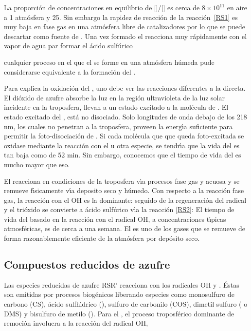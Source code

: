 La proporci\'on de concentraciones en equilibrio de []/[]   es cerca de $8\times10^{11}$ en aire a 1 atm\'osfera y 25\celsius. Sin embargo la rapidez de reacci\'on de la reacci\'on~\ref{RS1}  es muy baja en fase gas en una atm\'osfera libre de catalizadores por lo que se puede descartar como fuente de . Una vez formado el   reacciona muy r\'apidamente con el vapor de agua par formar el \'acido sulf\'urico 

cualquier proceso en el que el  se forme en una atm\'osfera h\'umeda pude considerarse equivalente a la formaci\'on del .

Para explica la oxidaci\'on del , uno debe ver las reacciones diferentes a la directa. El di\'oxido de azufre absorbe la luz en la regi\'on ultravioleta de  la luz solar incidente en la troposfera, llevan a un estado excitado a la mol\'ecula de .
El estado excitado del , est\'a no disociado. Solo longitudes de onda debajo de los 218 nm, los cuales no penetran a la troposfera, proveen la energ\'{\i}a suficiente para permitir la foto-disociaci\'on de . Si cada mol\'ecula que  que queda foto-excitada se oxidase mediante la reacci\'on con el  u otra especie, se tendr\'{\i}a que la vida del  es tan baja como de 52 min. Sin embargo, conocemos que el tiempo de vida del  es mucho mayor que eso.

El   reacciona en condiciones de la troposfera v\'{\i}a procesos fase gas y acuosa y se remueve f\'{\i}sicamente v\'{\i}a deposito seco y h\'umedo. Con respecto a la reacci\'on fase gas, la reacci\'on con el OH es la dominante:
seguido de la regeneraci\'on del radical 
y el tri\'oxido se convierte a \'acido sulf\'urico v\'{\i}a la reacci\'on \ref{RS2}:
El tiempo de vida del  basado en la reacci\'on con el radical OH, a concentraciones t\'{\i}picas atmosf\'ericas, es de cerca a una semana. El  es uno de los gases que se remueve de forma razonablemente eficiente de la atm\'osfera por dep\'osito seco.

\subsection{Compuestos reducidos de azufre}\label{crso2}
Las especies reducidas de azufre  RSR' reacciona con los radicales OH y . \'Estas son emitidas por procesos biog\'enicos liberando especies como monosulfuro de carbono (CS), \'acido sulfh\'{\i}drico (), sulfuro de carbonilo (COS), dimetil sulfuro ( o DMS) y bisulfuro de metilo (). Para el , el proceso troposf\'erico dominante de remoci\'on involucra a la reacci\'on del radical OH,

